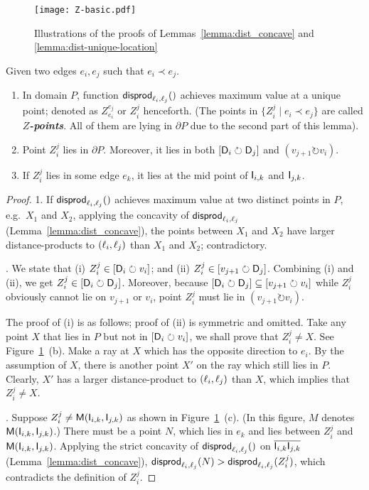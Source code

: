 \documentclass{ws-ijcga}
\begin{document}
\begin{figure}[h]
  \centering \texttt{[image: Z-basic.pdf]}
  \caption{Illustrations of the proofs of Lemmas~\ref{lemma:dist_concave}  and \ref{lemma:dist-unique-location}}\label{fig:Z_basic}
\end{figure}

\begin{lemma}\label{lemma:dist-unique-location}
Given two edges $e_i,e_j$ such that $e_i\prec e_j$.
\begin{enumerate}
\item In domain $P$, function $\mathsf{disprod}_{\ell_i,\ell_j}()$ achieves maximum value at a unique point;
    denoted as $Z_{e_i}^{e_j}$ or $Z_i^j$ henceforth.
        (The points in $\{Z_i^j\mid e_i\prec e_j\}$ are called \textbf{\emph{$Z$-points}}. All of them are lying in $\partial P$ due to the second part of this lemma).
\item Point $Z_i^j$ lies in $\partial P$. Moreover, it lies in both $[\mathsf{D}_i\circlearrowright\mathsf{D}_j]$ and $(v_{j+1}\circlearrowright v_i)$.
\item If $Z_i^j$ lies in some edge $e_k$, it lies at the mid point of $\mathsf{I}_{i,k}$ and $\mathsf{I}_{j,k}$.
\end{enumerate}
\end{lemma}


\begin{proof}
1. If $\mathsf{disprod}_{\ell_i,\ell_j}()$ achieves maximum value at two distinct points in $P$, e.g.\ $X_1$ and $X_2$,
applying the concavity of $\mathsf{disprod}_{\ell_i,\ell_j}$ (Lemma~\ref{lemma:dist_concave}),
  the points between $X_1$ and $X_2$ have larger distance-products to $(\ell_i,\ell_j)$ than $X_1$ and $X_2$; contradictory.

\smallskip{}. We state that (i) $Z_i^j\in [\mathsf{D}_i\circlearrowright v_i]$; and (ii) $Z_i^j\in [v_{j+1}\circlearrowright\mathsf{D}_j]$.
Combining (i) and (ii), we get $Z_i^j \in [\mathsf{D}_i\circlearrowright \mathsf{D}_j]$.
Moreover, because $[\mathsf{D}_i\circlearrowright\mathsf{D}_j]\subseteq[v_{j+1}\circlearrowright v_i]$ while $Z_i^j$ obviously cannot lie on $v_{j+1}$ or $v_i$, point $Z_i^j$ must lie in $(v_{j+1}\circlearrowright v_i)$.

The proof of (i) is as follows; proof of (ii) is symmetric and omitted.
Take any point $X$ that lies in $P$ but not in $[\mathsf{D}_i\circlearrowright v_i]$, we shall prove that $Z_i^j\neq X$.
See Figure~\ref{fig:Z_basic}~(b). Make a ray at $X$ which has the opposite direction to $e_i$.
By the assumption of $X$, there is another point $X'$ on the ray which still lies in $P$.
Clearly, $X'$ has a larger distance-product to $(\ell_i,\ell_j)$ than $X$, which implies that $Z_i^j\neq X$.

\smallskip {}. Suppose $Z_i^j\neq \mathsf{M}(\mathsf{I}_{i,k},\mathsf{I}_{j,k})$ as shown in Figure~\ref{fig:Z_basic}~(c). (In this figure, $M$ denotes $\mathsf{M}(\mathsf{I}_{i,k},\mathsf{I}_{j,k})$.)
There must be a point $N$, which lies in $e_k$ and lies between $Z_i^j$ and $\mathsf{M}(\mathsf{I}_{i,k},\mathsf{I}_{j,k})$. Applying the strict concavity of $\mathsf{disprod}_{\ell_i,\ell_j}()$ on $\overline{\mathsf{I}_{i,k}\mathsf{I}_{j,k}}$ (Lemma~\ref{lemma:dist_concave}), $\mathsf{disprod}_{\ell_i,\ell_j}(N)>\mathsf{disprod}_{\ell_i,\ell_j}(Z_i^j)$, which contradicts the definition of $Z_i^j$.
 \end{proof}
\end{document}
